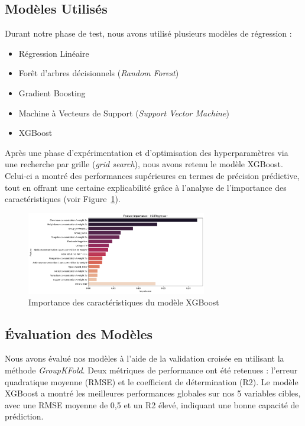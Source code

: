 \documentclass{article}
\begin{document}
\subsection{Modèles Utilisés}

Durant notre phase de test, nous avons utilisé plusieurs modèles de régression :

\begin{itemize}
\item Régression Linéaire
\item Forêt d’arbres décisionnels (\textit{Random Forest})
\item Gradient Boosting
\item Machine à Vecteurs de Support (\textit{Support Vector Machine})
\item XGBoost
\end{itemize}

Après une phase d’expérimentation et d’optimisation des hyperparamètres via une recherche par grille (\textit{grid search}), nous avons retenu le modèle XGBoost. Celui-ci a montré des performances supérieures en termes de précision prédictive, tout en offrant une certaine explicabilité grâce à l’analyse de l’importance des caractéristiques (voir Figure~\ref{fig:xgboost_feature_importance}).

\begin{figure}[H]
    \centering
    \includegraphics[width=0.7\textwidth]{images/xgboost_feature_importance.png}
    \caption{Importance des caractéristiques du modèle XGBoost}
    \label{fig:xgboost_feature_importance}
\end{figure}

\subsection{Évaluation des Modèles}

Nous avons évalué nos modèles à l’aide de la validation croisée en utilisant la méthode \textit{GroupKFold}. Deux métriques de performance ont été retenues : l’erreur quadratique moyenne (RMSE) et le coefficient de détermination (R2). Le modèle XGBoost a montré les meilleures performances globales sur nos 5 variables cibles, avec une RMSE moyenne de 0,5 et un R2 élevé, indiquant une bonne capacité de prédiction.
\end{document}
